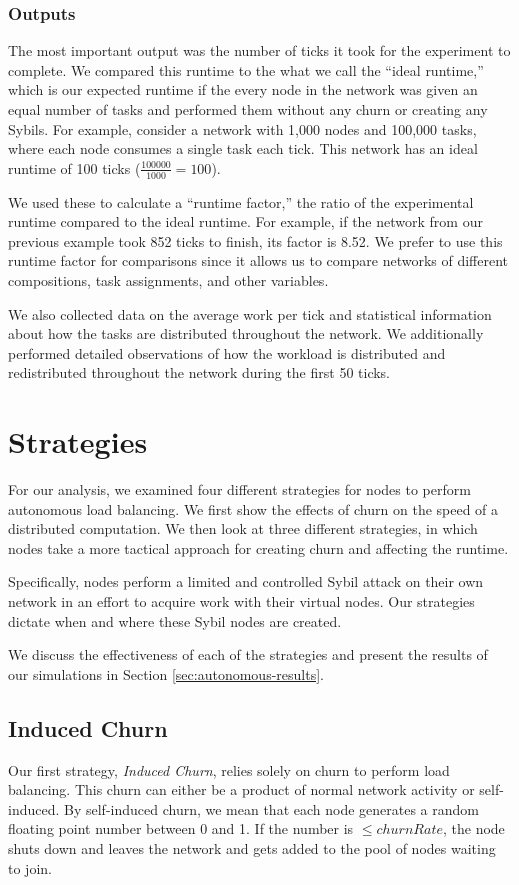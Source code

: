 \documentclass[11pt,conference]{IEEEtran}
\begin{document}
\subsubsection{Outputs}
The most important output was the number of ticks it took for the experiment to complete.
We compared this runtime to the what we call the ``ideal runtime,'' which is our expected runtime if the every node in the network was given an equal number of tasks and performed them without any churn or creating any Sybils.
For example, consider a network with 1,000 nodes and 100,000 tasks, where each node consumes a single task each tick. 
This network has an ideal runtime of 100 ticks ($ \frac{100000}{1000} = 100$).

We used these to calculate a ``runtime factor,'' the ratio of the experimental runtime compared to the ideal runtime.
For example, if the network from our previous example took 852 ticks to finish, its factor is 8.52.
We prefer to use this runtime factor for comparisons since it allows us to compare networks of different compositions, task assignments, and other variables.

We also collected data on the average work per tick and statistical information about how the tasks are distributed throughout the network.
We additionally performed detailed observations of how the workload is  distributed and redistributed throughout the network during the first 50 ticks.

\section{Strategies}
\label{sec:strategies}

For our analysis, we examined four different strategies for nodes to perform autonomous load balancing.
We first show the effects of churn on the speed of a distributed computation.
We then look at three different strategies, in which nodes take a more tactical approach for creating churn and affecting the runtime.

Specifically, nodes perform a limited and controlled Sybil attack \cite{sybil} on their own network in an effort to acquire work with their virtual nodes.
Our strategies dictate when and where these Sybil nodes are created.

We discuss the effectiveness of each of the strategies and present the results of our simulations in Section \ref{sec:autonomous-results}.



\subsection{Induced Churn}
\label{sec:strat-churn}
Our first strategy, \textit{Induced Churn}, relies solely on churn to perform load balancing.
This churn can either be a product of normal network activity or self-induced.
By self-induced churn, we mean that each node generates a random floating point number between 0 and 1.
If the number is $\leq churnRate$, the node shuts down and leaves the network and gets added to the pool of nodes waiting to join.
\end{document}
